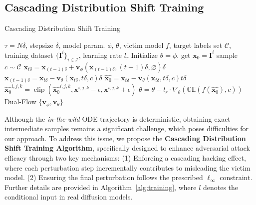 \subsection{Cascading Distribution Shift Training}
\label{l2_v}

\begin{algorithm}[tb]
   \caption{Cascading Distribution Shift Training}
   \label{alg:training}
\begin{algorithmic}
    $\tau = N\delta$, stepsize $\delta$, model param. $\phi$, $\theta$, victim model $f$, target labels set $\mathcal{C}$, training dataset $\{\mathbf{I}^i\}_{i\in \mathcal{I}}$, learning rate $l_r$
   \STATE Initialize $\theta = \phi$.
   \REPEAT
   \STATE get $\mathbf{x}_0 = \mathbf{I}^i$
   \STATE sample $c \sim \mathcal{C}$
   \STATE $\mathbf{x}_{t\delta} = \mathbf{x}_{(t-1)\delta} + \mathbf{v}_\phi(\mathbf{x}_{(t-1)\delta}, (t-1)\delta, \varnothing) \delta$
   \ENDFOR
   \STATE $\mathbf{x}_{(t-1)\delta} = \mathbf{x}_{t\delta} - \mathbf{v}_\theta(\mathbf{x}_{t\delta}, t\delta, c) \delta$
   \STATE $\widehat{\mathbf{x}_0} = \mathbf{x}_{t\delta} - \mathbf{v}_\theta(\mathbf{x}_{t\delta}, t\delta, c) t \delta$
   \STATE $\widehat{\mathbf{x}_0}^{i,j,k} = \operatorname{clip}\left( \widehat{\mathbf{x}_0}^{i,j,k}, \mathbf{x}^{i,j,k} - \epsilon, \mathbf{x}^{i,j,k} + \epsilon \right)$
   \STATE $\theta = \theta - l_r \cdot \nabla_\theta(\mathbb{CE}(f(\widehat{\mathbf{x}_0}), c))$
   \ENDFOR
   \ENDFOR
    Dual-Flow $\{\mathbf{v}_\phi,\mathbf{v}_\theta\}$
\end{algorithmic}
\end{algorithm}

Although the \textit{in-the-wild} ODE trajectory is deterministic, obtaining exact intermediate samples remains a significant challenge, which poses difficulties for our approach. To address this issue, we propose the \textbf{Cascading Distribution Shift Training Algorithm}, specifically designed to enhance adversarial attack efficacy through two key mechanisms: 
(1) Enforcing a cascading hacking effect, where each perturbation step incrementally contributes to misleading the victim model.  
(2) Ensuring the final perturbation follows the prescribed $\ell_\infty$ constraint.  
Further details are provided in Algorithm~\ref{alg:training}, where $l$ denotes the conditional input in real diffusion models. 

